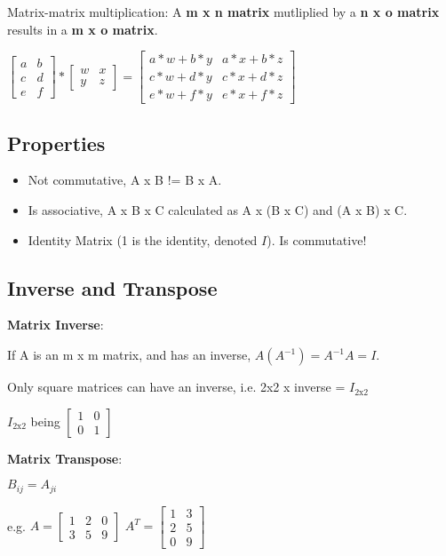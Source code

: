 \documentclass[12pt] {article}
\begin{document}
{    Matrix-matrix multiplication: A \textbf{m x n matrix} mutliplied by a 
    \textbf{n x o matrix} results in a \textbf{m x o matrix}.

    $\begin{bmatrix} a & b \\ c & d \\ e & f \end{bmatrix} * \begin{bmatrix} 
    w & x \\ y & z \end{bmatrix} = \begin{bmatrix} a*w+b*y & a*x+b*z \\ 
    c*w+d*y & c*x+d*z \\ e*w+f*y & e*x+f*z \end{bmatrix}$

  \newpage

  \subsection{Properties}

    \begin{itemize}
      \item Not commutative, A x B != B x A.
      \item Is associative, A x B x C calculated as A x (B x C) and
        (A x B) x C.
      \item Identity Matrix (1 is the identity, denoted $I$). 
        Is commutative!
    \end{itemize}       

  \subsection{Inverse and Transpose}

    \textbf{Matrix Inverse}:

    If A is an m x m matrix, and has an inverse,
    $A(A^{-1}) = A^{-1} A = I$.     

    Only square matrices can have an inverse, i.e. 2x2 x inverse = 
    $I_{\text{2x2}}$

    $I_{\text{2x2}}$ being $\begin{bmatrix} 1 & 0 \\ 0 & 1 \end{bmatrix}$

    \textbf{Matrix Transpose}:

    $B_{ij} = A_{ji}$

    e.g. 
    $A = \begin{bmatrix} 1 & 2 & 0 \\ 3 & 5 & 9 \end{bmatrix}$
    $A^T = \begin{bmatrix} 1 & 3 \\ 2 & 5 \\ 0 & 9 \end{bmatrix}$     

}
\end{document}
